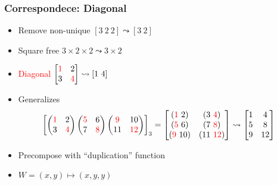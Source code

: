 \documentclass[xetex,mathserif,serif]{beamer}
\newcommand\NB[1]{\textcolor{red}{#1}}
\begin{document}
\begin{frame}
  \frametitle{Correspondece: Diagonal}
  \begin{itemize}%
    \item Remove non-unique \([3\ 2\ 2] \leadsto [3\ 2]\)
    \item Square free \(3\times 2\times 2\leadsto 3 \times 2\)
    \item \NB{Diagonal} \(
      \begin{bmatrix}
        \NB 1 & 2 \\
        3 & \NB 4
      \end{bmatrix} \leadsto [1\ 4]
      \)
    \item Generalizes \[
      \!\!\!\!
      \begin{bmatrix}
        \begin{pmatrix}
          \NB 1 & 2 \\ 3 &\NB  4
        \end{pmatrix}
        \begin{pmatrix}
          \NB 5 & 6 \\ 7 & \NB 8
        \end{pmatrix}
        \begin{pmatrix}
          \NB 9 & 10 \\ 11 & \NB{12}
        \end{pmatrix}
      \end{bmatrix}_3 = 
      \begin{bmatrix}
        (\NB 1\ 2) & (3\ \NB 4) \\
        (\NB 5\ 6) & (7\ \NB 8) \\
        (\NB 9\ 10) & (11\ \NB{12})
      \end{bmatrix} \leadsto
      \begin{bmatrix}
        1 & 4 \\
        5 & 8 \\
        9 & 12 
      \end{bmatrix}
      \]
    \item Precompose with ``duplication'' function
    \item \(W = (x, y) \mapsto (x, y, y)\)
  \end{itemize}
\end{frame}
\end{document}
